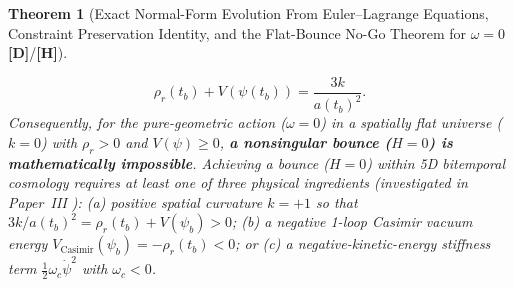 \documentclass[11pt,a4paper]{article}
\newcommand{\catD}{\textbf{\textcolor{blue!75!black}{[D]}}}
\newcommand{\catH}{\textbf{\textcolor{orange!85!black}{[H]}}}
\newtheorem{theorem}{Theorem}[section]
\theoremstyle{definition}
\theoremstyle{remark}
\begin{document}
\begin{theorem}[Exact Normal-Form Evolution From Euler--Lagrange Equations, Constraint Preservation Identity, and the Flat-Bounce No-Go Theorem for $\omega = 0$ \catD/\catH]
\begin{enumerate}
  \begin{equation}
    \rho_r(t_b) + V\!\left(\psi(t_b)\right) = \frac{3 k}{a(t_b)^2}.
    \label{eq:bounce_necessary_condition}
  \end{equation}
  Consequently, for the pure-geometric action ($\omega = 0$) in a spatially flat universe ($k = 0$) with $\rho_r > 0$ and $V(\psi) \ge 0$, \textbf{a nonsingular bounce ($H = 0$) is mathematically impossible}. Achieving a bounce ($H = 0$) within 5D bitemporal cosmology requires at least one of three physical ingredients (investigated in Paper~III \cite{JV_Paper3}): (a) positive spatial curvature $k = +1$ so that $3k/a(t_b)^2 = \rho_r(t_b) + V(\psi_b) > 0$; (b) a negative 1-loop Casimir vacuum energy $V_{\text{Casimir}}(\psi_b) = -\rho_r(t_b) < 0$; or (c) a negative-kinetic-energy stiffness term $\frac{1}{2}\omega_c\dot{\psi}^2$ with $\omega_c < 0$.
\end{enumerate}
\end{theorem}
\end{document}

